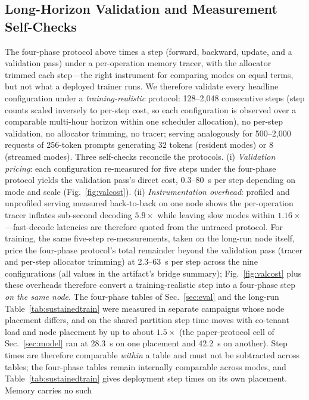 \documentclass[journal]{IEEEtran}
\begin{document}
\subsection{Long-Horizon Validation and Measurement Self-Checks}\label{sec:longhorizon}
The four-phase protocol above times a step (forward, backward,
update, and a validation pass) under a per-operation memory tracer, with
the allocator trimmed each step---the right instrument for comparing modes
on equal terms, but not what a deployed trainer runs. We therefore validate
every headline configuration under a \emph{training-realistic} protocol:
128--2{,}048 consecutive steps (step counts scaled inversely to per-step
cost, so each configuration is observed over a comparable multi-hour
horizon within one scheduler allocation), no per-step validation, no
allocator trimming, no tracer; serving analogously for 500--2{,}000 requests of 256-token prompts
generating 32 tokens (resident modes) or 8 (streamed modes). Three self-checks reconcile the protocols. (i) \emph{Validation
pricing}: each configuration re-measured for five steps under the
four-phase protocol yields the validation pass's direct cost, 0.3--80~s
per step depending on mode and scale (Fig.~\ref{fig:valcost}).
(ii) \emph{Instrumentation overhead}: profiled and unprofiled serving
measured back-to-back on one node shows the per-operation tracer inflates
sub-second decoding $5.9\times$ while leaving slow modes within
$1.16\times$---fast-decode latencies are therefore quoted from the
untraced protocol. For training, the same five-step re-measurements, taken on the long-run
node itself, price the four-phase protocol's total remainder beyond the
validation pass (tracer and per-step allocator trimming) at 2.3--63~s per
step across the nine configurations (all values in the artifact's bridge
summary); Fig.~\ref{fig:valcost} plus these overheads therefore convert a
training-realistic step into a four-phase step \emph{on the same node}.
The four-phase tables of Sec.~\ref{sec:eval} and the long-run
Table~\ref{tab:sustainedtrain} were measured in separate campaigns whose
node placement differs, and on the shared partition step time moves with
co-tenant load and node placement by up to about $1.5\times$ (the
paper-protocol cell of Sec.~\ref{sec:model} ran at 28.3~s on one placement
and 42.2~s on another). Step times are therefore comparable \emph{within}
a table and must not be subtracted across tables; the four-phase tables
remain internally comparable across modes, and Table~\ref{tab:sustainedtrain}
gives deployment step times on its own placement. Memory carries no such
\end{document}
